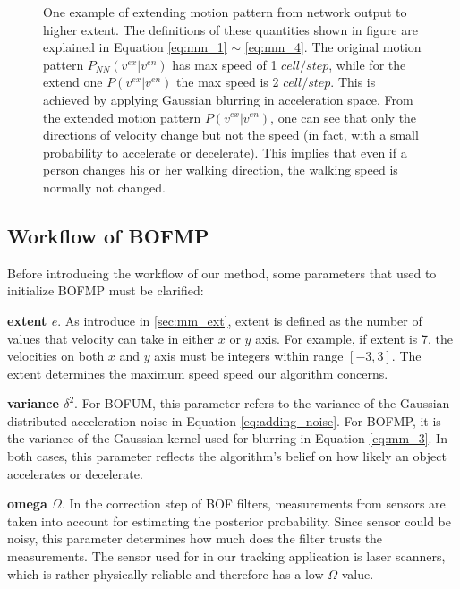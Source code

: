\begin{figure}[hp]
\begin{tabular}{cc}
\end{tabular} 
\caption[One example of extending motion pattern probabilities from network output to higher extent.]{One example of extending motion pattern from network output to higher extent. The definitions of these quantities shown in figure are explained in Equation \ref{eq:mm_1} $\sim$ \ref{eq:mm_4}. The original motion pattern $P_{NN}(v^{ex}|v^{en})$ has max speed of 1 $cell/step$, while for the extend one $P(v^{ex}|v^{en})$ the max speed is 2 $cell/step$. This is achieved by applying Gaussian blurring in acceleration space. From the extended motion pattern $P(v^{ex}|v^{en})$, one can see that only the directions of velocity change but not the speed (in fact, with a small probability to accelerate or decelerate). This implies that even if a person changes his or her walking direction, the walking speed is normally not changed.} 
\label{fig:mm_ext}
\end{figure}

\subsection{Workflow of BOFMP}

Before introducing the workflow of our method, some parameters that used to initialize BOFMP must be clarified:

\begin{my_enumerate}
\item \textbf{extent \( e\)}. As introduce in \ref{sec:mm_ext}, extent is defined as the number of values that velocity can take in either $x$ or $y$ axis.	For example, if extent is 7, the velocities on both $x$ and $y$ axis must be integers within range  \( [-3, 3] \). The extent determines the maximum speed speed our algorithm concerns. 
\item \textbf{variance \( \delta^2\)}. For BOFUM, this parameter refers to the variance of the Gaussian distributed acceleration noise in Equation \ref{eq:adding_noise}. For BOFMP, it is the variance of the Gaussian kernel used for blurring in Equation \ref{eq:mm_3}. In both cases, this parameter reflects the algorithm's belief on how likely an object accelerates or decelerate.
\item \textbf{omega \( \Omega \)}. In the correction step of BOF filters, measurements from sensors are taken into account for estimating the posterior probability. Since sensor could be noisy, this parameter determines how much does the filter trusts the measurements. The sensor used for in our tracking application is laser scanners, which is rather physically reliable and therefore has a low \( \Omega \) value.
\end{my_enumerate}

